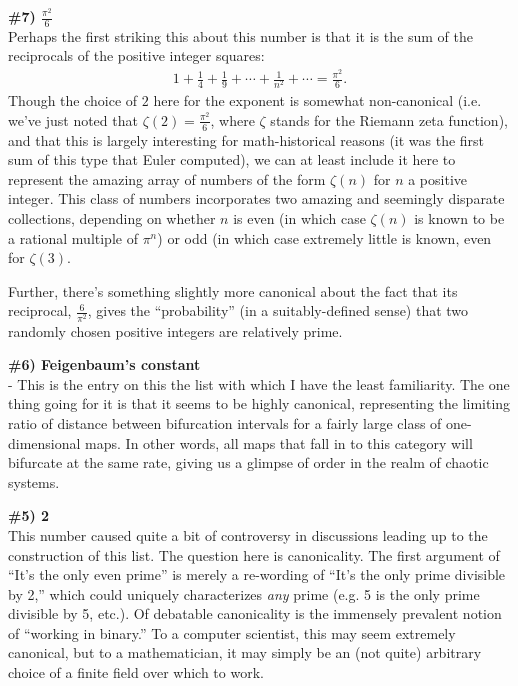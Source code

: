 \documentclass[12pt]{article}
\newcommand{\<}{\langle}
\renewcommand{\>}{\rangle}
\begin{document}
\textbf{{\Large \#7) $\frac{\pi^2}{6}$}}\\ Perhaps the first striking
this about this number is that it is the sum of the reciprocals of the
positive integer squares:
\begin{align*}
1+\frac{1}{4}+\frac{1}{9}+\cdots+\frac{1}{n^2}+\cdots=\frac{\pi^2}{6}.
\end{align*}
Though the choice of $2$ here for the exponent is somewhat
non-canonical (i.e. we've just noted that $\zeta(2)=\frac{\pi^2}{6}$,
where $\zeta$ stands for the Riemann zeta function), and that this is
largely interesting for math-historical reasons (it was the first sum
of this type that Euler computed), we can at least include it here to
represent the amazing array of numbers of the form $\zeta(n)$ for $n$
a positive integer.  This class of numbers incorporates two amazing
and seemingly disparate collections, depending on whether $n$ is even
(in which case $\zeta(n)$ is known to be a rational multiple of
$\pi^n$) or odd (in which case extremely little is known, even for
$\zeta(3)$.

Further, there's something slightly more canonical about the fact that
its reciprocal, $\frac{6}{\pi^2}$, gives the ``probability'' (in a
suitably-defined sense) that two randomly chosen positive integers are
relatively prime.

 \textbf{{\Large \#6) Feigenbaum's constant}}\\ - This is the entry on
 this the list with which I have the least familiarity.  The one thing
 going for it is that it seems to be highly canonical, representing
 the limiting ratio of distance between bifurcation intervals for a
 fairly large class of one-dimensional maps.  In other words, all maps
 that fall in to this category will bifurcate at the same rate, giving
 us a glimpse of order in the realm of chaotic systems.

\textbf{{\Large \#5) 2}}\\ This number caused quite a bit of
controversy in discussions leading up to the construction of this list.
The question here is canonicality.  The first argument of ``It's the
only even prime'' is merely a re-wording of ``It's the only prime
divisible by 2,'' which could uniquely characterizes \emph{any} prime
(e.g. 5 is the only prime divisible by 5, etc.).  Of debatable
canonicality is the immensely prevalent notion of ``working in
binary.''  To a computer scientist, this may seem extremely canonical,
but to a mathematician, it may simply be an (not quite) arbitrary
choice of a finite field over which to work.
\end{document}
